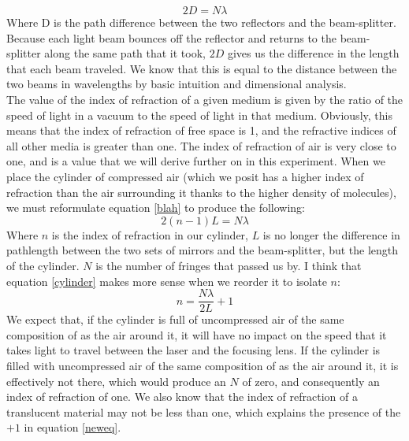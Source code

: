 \documentclass{amsart}
\begin{document}
\begin{equation}
    2D = N\lambda
\end{equation}
Where D is the path difference between the two reflectors and the beam-splitter. Because each light beam bounces off the reflector and returns to the beam-splitter along the same path that it took, $2D$ gives us the difference in the length that each beam traveled. We know that this is equal to the distance between the two beams in wavelengths by basic intuition and dimensional analysis.
\\
The value of the index of refraction of a given medium is given by the ratio of the speed of light in a vacuum to the speed of light in that medium. Obviously, this means that the index of refraction of free space is 1, and the refractive indices of all other media is greater than one. The index of refraction of air is very close to one, and is a value that we will derive further on in this experiment.
When we place the cylinder of compressed air (which we posit has a higher index of refraction than the air surrounding it thanks to the higher density of molecules), we must reformulate equation \ref{blah} to produce the following:
\begin{equation}
    \label{cylinder}
    2(n-1)L = N\lambda
\end{equation}
Where $n$ is the index of refraction in our cylinder, $L$ is no longer the difference in pathlength between the two sets of mirrors and the beam-splitter, but the length of the cylinder. $N$ is the number of fringes that passed us by. I think that equation \ref{cylinder} makes more sense when we reorder it to isolate $n$:
\begin{equation}
    \label{neweq}
    n = \dfrac{N\lambda}{2L} + 1
\end{equation}
We expect that, if the cylinder is full of uncompressed air of the same composition of as the air around it, it will have no impact on the speed that it takes light to travel between the laser and the focusing lens. If the cylinder is filled with uncompressed air of the same composition of as the air around it, it is effectively not there, which would produce an $N$ of zero, and consequently an index of refraction of one. We also know that the index of refraction of a translucent material may not be less than one, which explains the presence of the $+1$ in equation \ref{neweq}.
\end{document}
